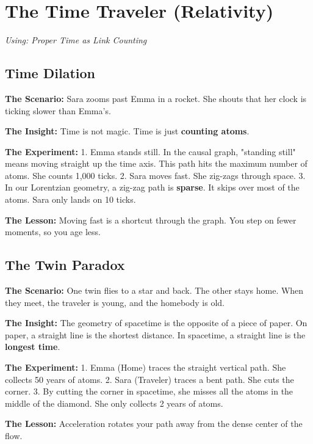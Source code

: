 \documentclass[11pt, a4paper, openany]{book}
\begin{document}
\chapter{The Time Traveler (Relativity)}
\textit{Using: Proper Time as Link Counting}

\section{Time Dilation}
\begin{thoughtexp}
\textbf{The Scenario:} Sara zooms past Emma in a rocket. She shouts that her clock is ticking slower than Emma's.

\textbf{The Insight:} Time is not magic. Time is just \textbf{counting atoms}.

\textbf{The Experiment:}
1. Emma stands still. In the causal graph, "standing still" means moving straight up the time axis. This path hits the maximum number of atoms. She counts 1,000 ticks.
2. Sara moves fast. She zig-zags through space.
3. In our Lorentzian geometry, a zig-zag path is \textbf{sparse}. It skips over most of the atoms. Sara only lands on 10 ticks.

\textbf{The Lesson:} Moving fast is a shortcut through the graph. You step on fewer moments, so you age less.
\end{thoughtexp}

\section{The Twin Paradox}
\begin{thoughtexp}
\textbf{The Scenario:} One twin flies to a star and back. The other stays home. When they meet, the traveler is young, and the homebody is old.

\textbf{The Insight:} The geometry of spacetime is the opposite of a piece of paper. On paper, a straight line is the shortest distance. In spacetime, a straight line is the \textbf{longest time}.

\textbf{The Experiment:}
1. Emma (Home) traces the straight vertical path. She collects 50 years of atoms.
2. Sara (Traveler) traces a bent path. She cuts the corner.
3. By cutting the corner in spacetime, she misses all the atoms in the middle of the diamond. She only collects 2 years of atoms.

\textbf{The Lesson:} Acceleration rotates your path away from the dense center of the flow.
\end{thoughtexp}
\end{document}
